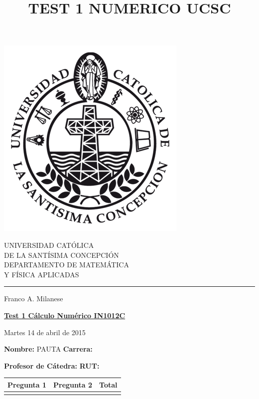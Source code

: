 \documentclass[11pt]{article}
\begin{document}
\title{TEST 1 NUMERICO UCSC}

\begin{minipage}{0.15\textwidth}
\includegraphics[width=\textwidth]{ucsc.png}
\end{minipage}
\begin{minipage}{0.9\textwidth}
{UNIVERSIDAD CAT\'OLICA}\\ 
{DE LA SANT\'ISIMA CONCEPCI\'ON}\\
{DEPARTAMENTO DE MATEM\'ATICA}\\ 
{ Y F\'ISICA APLICADAS}\\
\rule{0.66\textwidth}{.5pt} Franco A. Milanese
\end{minipage}

\vspace*{0.5cm} \centerline {\bf\underline{Test 1 C\'alculo Num\'erico IN1012C }}
\centerline{\textrm{Martes 14 de abril de 2015}}  

\vspace{0.2cm}
\textbf{Nombre:} PAUTA \hspace{0.65\textwidth}\textbf{Carrera:}

\vspace{0.1cm}
\textbf{Profesor de C\'atedra:}\hspace{0.5\textwidth} \textbf{ RUT:}
 \begin{center}
 \begin{tabular}{||p{2cm}|p{2cm}|p{2cm}||}
 \hline
 Pregunta 1 &  Pregunta 2 &     Total\\
 \hline

  \vspace{1.5cm} & &       \\
 \hline
 \end{tabular}
 \end{center}
\end{document}
